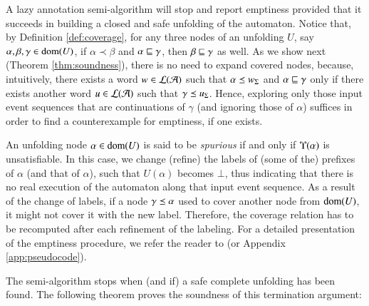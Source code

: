\documentclass{llncs}
\begin{document}
A lazy annotation semi-algorithm will stop and report emptiness
provided that it succeeds in building a closed and safe unfolding of
the automaton. Notice that, by Definition \ref{def:coverage}, for any
three nodes of an unfolding $U$, say $\alpha,\beta,\gamma \in
\mathrm{dom}(U)$, if $\alpha \prec \beta$ and $\alpha \sqsubseteq \gamma$, then
$\beta \sqsubseteq \gamma$ as well. As we show next (Theorem
\ref{thm:soundness}), there is no need to expand covered nodes,
because, intuitively, there exists a word $w \in {\mathcal L}({\mathcal{A}})$ such that
$\alpha \preceq {w}_\Sigma$ and $\alpha \sqsubseteq \gamma$ only if there
exists another word $u \in {\mathcal L}({\mathcal{A}})$ such that $\gamma \preceq
{u}_\Sigma$. Hence, exploring only those input event sequences that are
continuations of $\gamma$ (and ignoring those of $\alpha$) suffices in
order to find a counterexample for emptiness, if one exists.

An unfolding node $\alpha \in \mathrm{dom}(U)$ is said to be \emph{spurious}
if and only if $\Upsilon({\alpha})$ is unsatisfiable. In this case, we
change (refine) the labels of (some of the) prefixes of $\alpha$ (and
that of $\alpha$), such that $U(\alpha)$ becomes $\bot$, thus
indicating that there is no real execution of the automaton along that
input event sequence. As a result of the change of labels, if a node
$\gamma \preceq \alpha$ used to cover another node from $\mathrm{dom}(U)$, it
might not cover it with the new label. Therefore, the coverage
relation has to be recomputed after each refinement of the
labeling. For a detailed presentation of the emptiness procedure, we
refer the reader to \cite{IosifXu18} (or Appendix
\ref{app:pseudocode}).

The semi-algorithm stops when (and if) a safe complete unfolding has
been found. The following theorem proves the soundness of this
termination argument:
\end{document}
